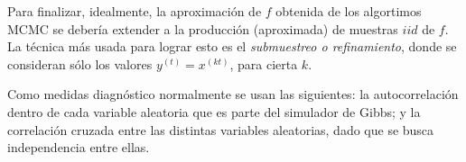 Para finalizar, idealmente, la aproximación de $f$ obtenida de los algortimos MCMC se debería extender a la producción (aproximada) de muestras $iid$ de $f$. La técnica más usada para lograr esto es el \textit{submuestreo o refinamiento}, donde se consideran s\'olo los valores $y^{(t)} = x^{(kt)}$, para cierta $k$.

Como medidas diagn\'ostico normalmente se usan las siguientes: la autocorrelaci\'on dentro de cada variable aleatoria que es parte del simulador de Gibbs; y la correlaci\'on cruzada entre las distintas variables aleatorias, dado que se busca independencia entre ellas.

\newpage